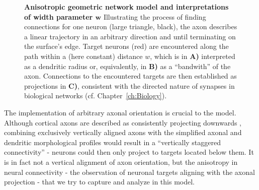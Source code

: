 \begin{figure}[!htbp]
  \centering 
    \caption{%
      \textbf{Anisotropic geometric network model and interpretations
        of width parameter $\boldsymbol w$} Illustrating the process
      of finding connections for one neuron (large triangle, black),
      the axon describes a linear trajectory in an arbitrary direction
      and until terminating on the surface's edge. Target neurons
      (red) are encountered along the path within a (here constant)
      distance $w$, which is in \textbf{A)} interpreted as a dendritic
      radius or, equivalently, in \textbf{B)} as a \enquote{bandwith}
      of the axon. Connections to the encountered targets are then
      established as projections in \textbf{C)}, consistent with the
      directed nature of synapses in biological networks
      (cf. Chapter~\ref{ch:Biology}).}
  \label{fig:anisotropic_network_model}
\end{figure}

The implementation of arbitrary axonal orientation is crucial to the
model. Although cortical axons are described as consistently
projecting downwards \parencite[%
cf. Section~\ref{sec:biol_anisotropy}]{Braitenberg_Cortex}, combining
exclusively vertically aligned axons with the simplified axonal and
dendritic morphological profiles would result in a \enquote{vertically
  staggered connectivity} - neurons could then only project to targets
located below them.  It is in fact not a vertical alignment of axon
orientation, but the anisotropy in neural connectivity - the
observation of neuronal targets aligning with the axonal projection -
that we try to capture and analyze in this model. 

